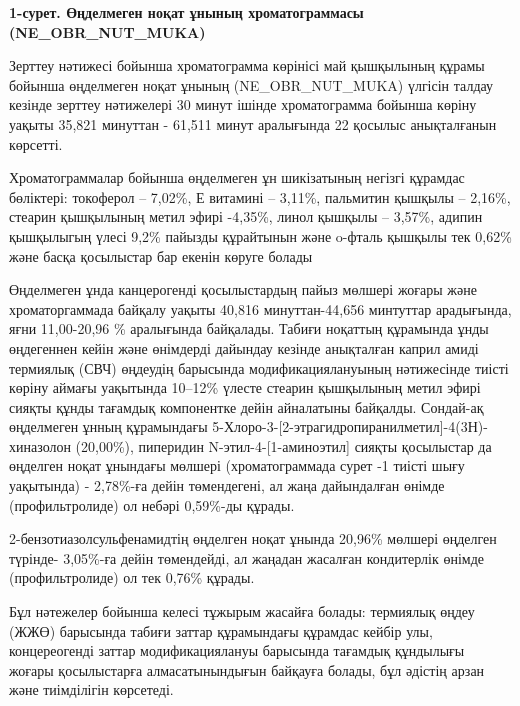 {\bfseries 1-сурет. Өңделмеген ноқат ұнының хроматограммасы
(NE\_OBR\_NUT\_MUKA)}

Зерттеу нәтижесі бойынша хроматограмма көрінісі май қышқылының құрамы
бойынша өңделмеген ноқат ұнының (NE\_OBR\_NUT\_MUKA) үлгісін талдау
кезінде зерттеу нәтижелері 30 минут ішінде хроматограмма бойынша көріну
уақыты 35,821 минуттан - 61,511 минут аралығында 22 қосылыс анықталғанын
көрсетті.

Хроматограммалар бойынша өңделмеген ұн шикізатының негізгі құрамдас
бөліктері: токоферол -- 7,02\%, Е витамині -- 3,11\%, пальмитин қышқылы
-- 2,16\%, стеарин қышқылының метил эфирі -4,35\%, линол қышқылы --
3,57\%, адипин қышқылыгың үлесі 9,2\% пайызды құрайтынын және o-фталь
қышқылы тек 0,62\% және басқа қосылыстар бар екенін көруге болады

Өңделмеген ұнда канцерогенді қосылыстардың пайыз мөлшері жоғары және
хроматоргаммада байқалу уақыты 40,816 минуттан-44,656 минтуттар
арадығында, яғни 11,00-20,96 \% аралығында байқалады. Табиғи ноқаттың
құрамында ұнды өңдегеннен кейін және өнімдерді дайындау кезінде
анықталған каприл амиді термиялық (СВЧ) өңдеудің барысында
модификациялануының нәтижесінде тиісті көріну аймағы уақытында 10--12\%
үлесте стеарин қышқылының метил эфирі сияқты құнды тағамдық компонентке
дейін айналатыны байқалды. Сондай-ақ өңделмеген ұнның құрамындағы
5-Хлоро-3-{[}2-этрагидропиранилметил{]}-4(3Н)-хиназолон (20,00\%),
пиперидин N-этил-4-{[}1-аминоэтил{]} сияқты қосылыстар да өңделген ноқат
ұнындағы мөлшері (хроматограммада сурет -1 тиісті шығу уақытында) -
2,78\%-ға дейін төмендегені, ал жаңа дайындалған өнімде (профильтролиде)
ол небәрі 0,59\%-ды құрады.

2-бензотиазолсульфенамидтің өңделген ноқат ұнында 20,96\% мөлшері
өңделген түрінде- 3,05\%-ға дейін төмендейді, ал жаңадан жасалған
кондитерлік өнімде (профильтролиде) ол тек 0,76\% құрады.

Бұл нәтежелер бойынша келесі тұжырым жасайға болады: термиялық өңдеу
(ЖЖӨ) барысында табиғи заттар құрамындағы құрамдас кейбір улы,
концереогенді заттар модификациялануы барысында тағамдық құндылығы
жоғары қосылыстарға алмасатынындығын байқауға болады, бұл әдістің арзан
және тиімділігін көрсетеді.

